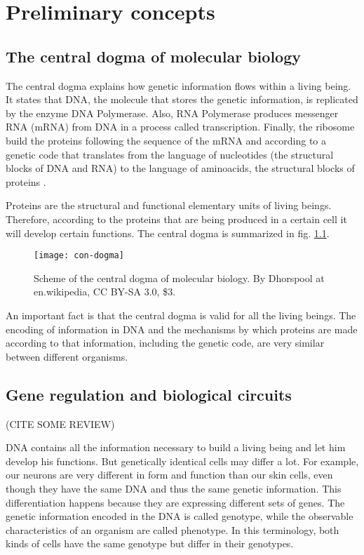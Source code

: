 \chapter{Preliminary concepts}

\section{The central dogma of molecular biology}

The central dogma explains how genetic information flows within a living being. It states that DNA, the molecule that stores the genetic information, is replicated by the enzyme DNA Polymerase. Also, RNA Polymerase produces messenger RNA (mRNA) from DNA in a process called transcription. Finally, the ribosome build the proteins following the sequence of the mRNA and according to a genetic code that translates from the language of nucleotides (the structural blocks of DNA and RNA) to the language of aminoacids, the structural blocks of proteins \cite{alberts13}.

Proteins are the structural and functional elementary units of living beings. Therefore, according to the proteins that are being produced in a certain cell it will develop certain functions. The central dogma is summarized in fig. \ref{fig:con-dogma}.

\begin{figure}[H]
  \centering
  \texttt{[image: con-dogma]}
  \caption[Central dogma of molecular biology]{\label{fig:con-dogma} Scheme of the central dogma of molecular biology. By Dhorspool at en.wikipedia, CC BY-SA 3.0, \$3.}
\end{figure}

An important fact is that the central dogma is valid for all the living beings. The encoding of information in DNA and the mechanisms by which proteins are made according to that information, including the genetic code, are very similar between different organisms.

\section{Gene regulation and biological circuits}
(CITE SOME REVIEW)

DNA contains all the information necessary to build a living being and let him develop his functions. But genetically identical cells may differ a lot. For example, our neurons are very different in form and function than our skin cells, even though they have the same DNA and thus the same genetic information. This differentiation happens because they are expressing different sets of genes. The genetic information encoded in the DNA is called genotype, while the observable characteristics of an organism are called phenotype. In this terminology, both kinds of cells have the same genotype but differ in their genotypes. \cite{alberts13}

